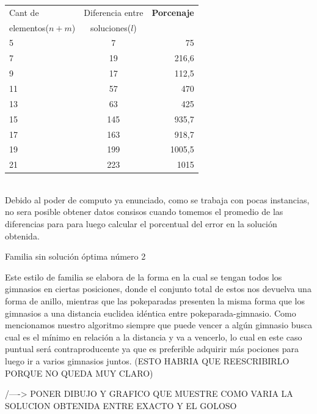    \begin{tabular}{ | l | c | r |}
   \hline
	Cant de & Diferencia entre  & \textbf{Porcenaje}  \\ 
elementos($n+m$) & soluciones($l$) &  \\ \hline
5 &	7 &	75 \\ \hline
7 &	19 & 216,6 \\ \hline
9 &	17 & 112,5 \\ \hline 
11 & 57 & 470 \\ \hline
13 & 63 & 425 \\ \hline
15 & 145 & 935,7 \\ \hline
17 & 163 & 918,7 \\ \hline
19 & 199 & 1005,5 \\ \hline
21 & 223 & 1015 \\ 
\hline
   \end{tabular}\\


Debido al poder de computo ya enunciado, como se trabaja con pocas instancias, no sera posible obtener datos consisos cuando tomemos el promedio de las diferencias para para luego calcular el porcentual del error en la soluci\'on obtenida.

\begin{center}
Familia sin soluci\'on \'optima n\'umero 2
\end{center}

Este estilo de familia se elabora de la forma en la cual se tengan todos los gimnasios en ciertas posiciones, donde el conjunto total de estos nos devuelva una forma de anillo, mientras que las pokeparadas presenten la misma forma que los gimnasios a una distancia euclidea id\'entica entre pokeparada-gimnasio. Como mencionamos nuestro algoritmo siempre que puede vencer a alg\'un gimnasio busca cual es el m\'inimo en relaci\'on a la distancia y va a vencerlo, lo cual en este caso puntual ser\'a contraproducente ya que es preferible adquirir m\'as pociones para luego ir a varios gimnasios juntos. (ESTO HABRIA QUE REESCRIBIRLO PORQUE NO QUEDA MUY CLARO)


/----> PONER DIBUJO Y GRAFICO QUE MUESTRE COMO VARIA LA SOLUCION OBTENIDA ENTRE EXACTO Y EL GOLOSO 

